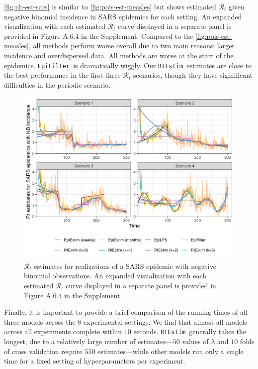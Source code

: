 \documentclass[10pt,letterpaper]{article}
\def\RtEstim{\texttt{RtEstim}}
\def\EpiFilter{\texttt{EpiFilter}}
\def\calR{\mathcal{R}}
\begin{document}
\autoref{fig:nb-est-sars} is similar to \autoref{fig:pois-est-measles} but
shows estimated $\calR_t$ given negative binomial incidence in SARS epidemics
for each setting. An expanded visualization with each estimated $\calR_t$ curve
displayed in a separate panel is provided in Figure A.6.4 in the Supplement.
Compared to the \autoref{fig:pois-est-measles}, all methods perform worse
overall due to two main reasons: larger incidence and overdispersed data. All
methods are worse at the start of the epidemics. \EpiFilter\ is dramatically
wiggly. Our \RtEstim\ estimates are close to the best
performance in the first three $\calR_t$ scenarios, though they have
siginificant difficulties in the periodic scenario. 

\begin{figure}[!t]
  \centering
  \includegraphics*[width=.9\linewidth]{fig/fig_res_NB_sars.png}
  \caption{
    $\calR_t$ estimates for realizations of a SARS epidemic with
    negative binomial observations. An expanded visualization with each estimated
    $\calR_t$ curve displayed in a separate panel is provided in Figure A.6.4 in
    the Supplement.}
  \label{fig:nb-est-sars}
\end{figure}

Finally, it is important to provide a brief comparison of the running times of
all three models across the $8$ experimental settings. We find that almost all
models across all experiments complete within $10$ seconds. \RtEstim\ generally
takes the longest, due to a relatively large number of estimates---$50$ values
of $\lambda$ and $10$ folds of cross validation require $550$ estimates---while
other models run only a single time for a fixed setting of hyperparameters per
experiment. 
\end{document}
